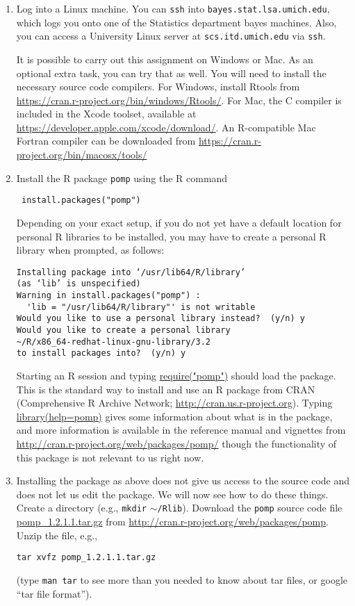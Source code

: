 \documentclass[12pt]{article}
\begin{document}
\begin{enumerate}

\item Log into a Linux machine. You can \texttt{ssh} into \texttt{bayes.stat.lsa.umich.edu}, which logs you onto one of the Statistics department bayes machines. Also, you can access a University Linux server at \texttt{scs.itd.umich.edu} via \texttt{ssh}.

It is possible to carry out this assignment on Windows or Mac. As an optional extra task, you can try that as well. You will need to install the necessary source code compilers. For Windows, install Rtools from
\url{https://cran.r-project.org/bin/windows/Rtools/}.
For Mac, the C compiler is included in the Xcode toolset, available at \url{https://developer.apple.com/xcode/download/}. An R-compatible Mac Fortran compiler can be downloaded from \url{https://cran.r-project.org/bin/macosx/tools/}


\item \label{cran} Install the R package \texttt{pomp} using the R command
\begin{verbatim}
 install.packages("pomp")
\end{verbatim}
Depending on your exact setup, if you do not yet have a default location for personal R libraries to be installed, you may have to create a personal R library when prompted, as follows:
\begin{verbatim}
Installing package into ‘/usr/lib64/R/library’
(as ‘lib’ is unspecified)
Warning in install.packages("pomp") :
  'lib = "/usr/lib64/R/library"' is not writable
Would you like to use a personal library instead?  (y/n) y
Would you like to create a personal library
~/R/x86_64-redhat-linux-gnu-library/3.2
to install packages into?  (y/n) y
\end{verbatim}
Starting an R session and typing \url{require("pomp")} should load the package. This is the standard way to install and use an R package from CRAN (Comprehensive R Archive Network; \url{http://cran.us.r-project.org}).
Typing \url{library(help=pomp)} gives some information about what is in the package, and more information is available in the reference manual and vignettes from \url{http://cran.r-project.org/web/packages/pomp/} though the functionality of this package is not relevant to us right now.

\item Installing the package as above does not give us access to the source code and does not let us edit the package. We will now see how to do these things. Create a directory (e.g., \texttt{mkdir} $\sim$\texttt{/Rlib}). 
Download the \texttt{pomp} source code file \url{pomp_1.2.1.1.tar.gz} from \url{http://cran.r-project.org/web/packages/pomp}. Unzip the file, e.g.,
\begin{verbatim}tar xvfz pomp_1.2.1.1.tar.gz \end{verbatim}
(type \texttt{man tar} to see more than you needed to know about tar files, or google ``tar file format'').


\end{enumerate}
\end{document}
